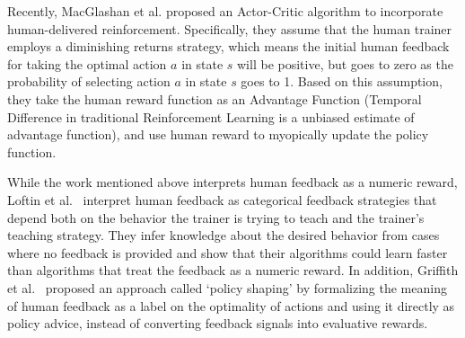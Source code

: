 \documentclass[10pt,journal,compsoc]{IEEEtran}
\begin{document}
Recently, MacGlashan et al. \cite{macglashanconvergent} proposed an Actor-Critic algorithm to incorporate human-delivered reinforcement. Specifically, they assume that the human trainer employs a diminishing returns strategy, which means the initial human feedback for taking the optimal action $a$ in state $s$ will be positive, but goes to zero as the probability of selecting action $a$ in state $s$ goes to 1. Based on this assumption, they take the human reward function as an Advantage Function (Temporal Difference in traditional Reinforcement Learning is a unbiased estimate of advantage function), and use human reward to myopically update the policy function.

While the work mentioned above interprets human feedback as a numeric reward, Loftin et al.\ \cite{loftin2015learning} interpret human feedback as categorical feedback strategies that depend both on the behavior the trainer is trying to teach and the trainer's teaching strategy. They infer knowledge about the desired behavior from cases where no feedback is provided and show that their algorithms could learn faster than algorithms that treat the feedback as a numeric reward. In addition, Griffith et al.\ \cite{griffith2013policy} proposed an approach called `policy shaping' by formalizing the meaning of human feedback as a label on the optimality of actions and using it directly as policy advice, instead of converting feedback signals into evaluative rewards. 



\end{document}
